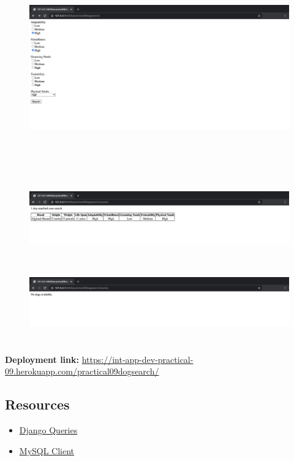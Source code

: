 \documentclass{article}
\begin{document}
\begin{figure}[H]
  \includegraphics[width=175mm, height=85mm]{./img/09-expected-dog-selector-1.png}
\end{figure}

\begin{figure}[H]
  \includegraphics[width=175mm, height=35mm]{./img/09-expected-dog-selector-2.png}
  \includegraphics[width=175mm, height=35mm]{./img/09-expected-dog-selector-3.png}
\end{figure}

\textbf{Deployment link:} \href{https://int-app-dev-practical-09.herokuapp.com/practical09dogsearch/}{https://int-app-dev-practical-09.herokuapp.com/practical09dogsearch/}

\subsection*{Resources} 
\begin{itemize}
  \item \href{https://docs.djangoproject.com/en/3.0/topics/db/queries/}{Django Queries}
  \item \href{https://pypi.org/project/mysqlclient/}{MySQL Client}
\end{itemize}
\end{document}
